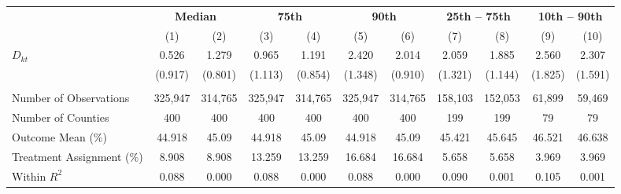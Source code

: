 \begin{tabular}{l*{1}cccccccccc}
\toprule
& \multicolumn{2}{c}{\textbf{Median}}
& \multicolumn{2}{c}{\textbf{75th}}
& \multicolumn{2}{c}{\textbf{90th}}
& \multicolumn{2}{c}{\textbf{25th -- 75th}}
& \multicolumn{2}{c}{\textbf{10th -- 90th}}
\\ 
& \multicolumn{1}{c}{(1)}
& \multicolumn{1}{c}{(2)}
& \multicolumn{1}{c}{(3)}
& \multicolumn{1}{c}{(4)}
& \multicolumn{1}{c}{(5)}
& \multicolumn{1}{c}{(6)}
& \multicolumn{1}{c}{(7)}
& \multicolumn{1}{c}{(8)}
& \multicolumn{1}{c}{(9)}
& \multicolumn{1}{c}{(10)}
\\ 



\midrule

$ D_{kt} $  &       0.526         &       1.279         &       0.965         &       1.191         &       2.420\sym{*} &       2.014\sym{**} &       2.059         &       1.885         &       2.560         &       2.307         \\
           &     (0.917)         &     (0.801)         &     (1.113)         &     (0.854)         &     (1.348)         &     (0.910)         &     (1.321)         &     (1.144)         &     (1.825)         &     (1.591)         \\
\\
Number of Observations&     325,947         &     314,765         &     325,947         &     314,765         &     325,947         &     314,765         &     158,103         &     152,053         &      61,899         &      59,469     \\
Number of Counties&         400         &         400         &         400         &         400         &         400   &         400         &         199         &         199         &          79         &          79         \\
Outcome Mean (\%)&      44.918         &       45.09         &      44.918         &       45.09         &      44.918    &       45.09         &      45.421         &      45.645         &      46.521         &      46.638         \\
Treatment Assignment (\%)&8.908         &8.908         &      13.259         &      13.259        &      16.684         &      16.684         &       5.658         &       5.658         &       3.969         &       3.969         
\\
Within $ R^2 $&       0.088         &       0.000         &       0.088         &       0.000         &       0.088       &       0.000         &       0.090         &       0.001         &       0.105         &       0.001         \\




\end{tabular}
